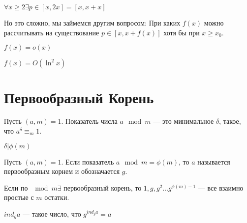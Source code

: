 \begin{proposition}
    \(\forall x \ge 2 \exists p \in [x, 2x] = [x, x + x]\)
\end{proposition}
Но это сложно, мы займемся другим вопросом: При каких \(f(x)\) можно рассчитывать на существование \(p \in [x, x + f(x)]\) хотя бы при \(x \ge x_0\).

\begin{proposition}
    \(f(x) = o(x)\)
\end{proposition}
\begin{proposition}[Гипотеза]
    \(f(x) = O(\ln^2x)\)
\end{proposition}

\section{Первообразный Корень}
\begin{definition}
    Пусть \((a, m) = 1\). Показатель числа \(a \mod m\) --- это минимальное \(\delta\), такое, что \(a^\delta \equiv_m 1\).
\end{definition}

\begin{proposition}
    \(\delta | \phi(m)\)
\end{proposition}
\begin{definition}
    Пусть \((a, m) = 1\). Если показатель \(a \mod m = \phi(m)\), то \(a\) называется первообразным корнем и обозначается \(g\).
\end{definition}
\begin{note}
    Если по \(\mod m \exists\) первообразный корень, то \(1, g, g^2 \dots g^{\phi(m) - 1}\) --- все взаимно простые с \(m\) остатки.
\end{note}
\begin{definition}
    \(ind_g a\) --- такое число, что \(g^{ind_ga} = a\)
\end{definition}